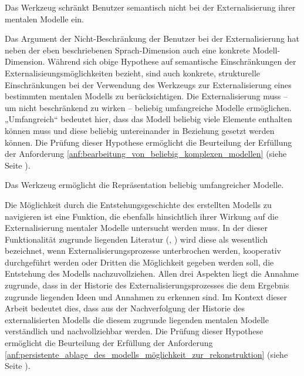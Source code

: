\begin{hyp}
	\label{hyp:keine_einschränkung}
	Das Werkzeug schränkt Benutzer semantisch nicht bei der Externalisierung ihrer mentalen Modelle ein.
\end{hyp}

Das Argument der Nicht-Beschränkung der Benutzer bei der Externalisierung hat neben der eben beschriebenen Sprach-Dimension auch eine konkrete Modell-Dimension. Während sich obige Hypothese auf semantische Einschränkungen der Externalisieungsmöglichkeiten bezieht, sind auch konkrete, strukturelle Einschränkungen bei der Verwendung des Werkzeugs zur Externalisierung eines bestimmten mentalen Modells zu berücksichtigen. Die Externalisierung muss -- um nicht beschränkend zu wirken -- beliebig umfangreiche Modelle ermöglichen. „Umfangreich“ bedeutet hier, dass das Modell beliebig viele Elemente enthalten können muss und diese beliebig untereinander in Beziehung gesetzt werden können. Die Prüfung dieser Hypothese ermöglicht die Beurteilung der Erfüllung der Anforderung \ref{anf:bearbeitung_von_beliebig_komplexen_modellen} (siehe Seite \pageref{anf:bearbeitung_von_beliebig_komplexen_modellen}).
	
\begin{hyp}
	\label{hyp:beliebige_komplexität}
	Das Werkzeug ermöglicht die Repräsentation beliebig umfangreicher Modelle.
\end{hyp}

Die Möglichkeit durch die Entstehungsgeschichte des erstellten Modells zu navigieren ist eine Funktion, die ebenfalls hinsichtlich ihrer Wirkung auf die Externalisierung mentaler Modelle untersucht werden muss. In der dieser Funktionalität zugrunde liegenden Literatur (\citep{Shipman00}, \citep{Klemmer02}) wird diese als wesentlich bezeichnet, wenn Externalisierungsprozesse unterbrochen werden, kooperativ durchgeführt werden oder Dritten die Möglichkeit gegeben werden soll, die Entstehung des Modells nachzuvollziehen. Allen drei Aspekten liegt die Annahme zugrunde, dass in der Historie des Externalisierungsprozesses die dem Ergebnis zugrunde liegenden Ideen und Annahmen zu erkennen sind. Im Kontext dieser Arbeit bedeutet dies, dass aus der Nachverfolgung der Historie des externalisierten Modells die diesem zugrunde liegenden mentalen Modelle verständlich und nachvollziehbar werden. Die Prüfung dieser Hypothese ermöglicht die Beurteilung der Erfüllung der Anforderung \ref{anf:persistente_ablage_des_modells_möglichkeit_zur_rekonstruktion} (siehe Seite \pageref{anf:persistente_ablage_des_modells_möglichkeit_zur_rekonstruktion}).

